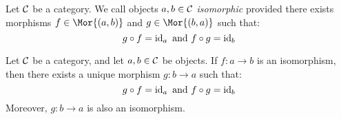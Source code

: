 \begin{definition}
  Let $\mathcal{C}$ be a category. We call objects $a,b \in \mathcal{C}$
  \textit{isomorphic} provided there exists morphisms $f \in
  \Mor{(a,b)}$ and $g \in \Mor{(b,a)}$ such that:
  \begin{equation*}
    g \circ f=\operatorname{id}_a \text{ and } f \circ g=\operatorname{id}_b
  \end{equation*}
\end{definition}

\begin{lemma}\label{lemma_1.1.1}
  Let $\mathcal{C}$ be a category, and let $a,b \in \mathcal{C}$ be objects. If $f:a
  \xrightarrow{} b$ is an isomorphism, then there exists a unique
  morphism $g:b \xrightarrow{} a$ such that:
  \begin{equation*}
    g \circ f=\operatorname{id}_a \text{ and } f \circ g=\operatorname{id}_b
  \end{equation*}
  Moreover, $g:b \xrightarrow{} a$ is also an isomorphism.
\end{lemma}

